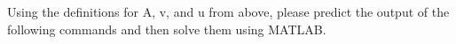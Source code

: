Using the definitions for A, v, and u from above, please predict the output of the following commands and then solve them using MATLAB.

\begin{solution}\ \\

\end{solution}